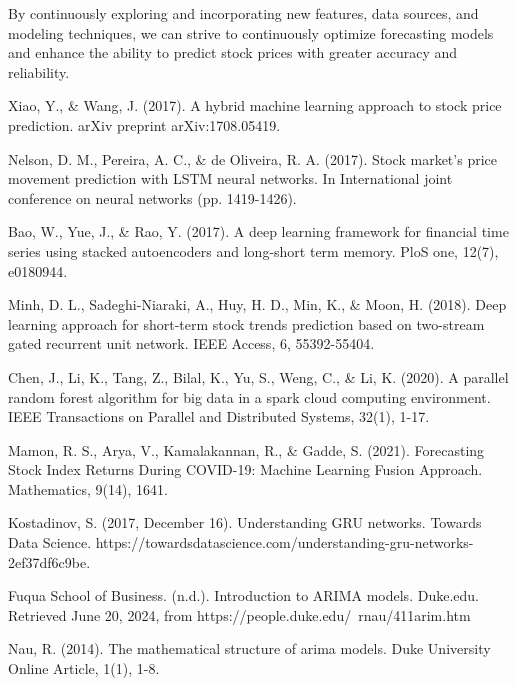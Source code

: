 \documentclass{ieeeojies}
\begin{document}
By continuously exploring and incorporating new features, data sources, and modeling techniques, we can strive to continuously optimize forecasting models and enhance the ability to predict stock prices with greater accuracy and reliability.
\begin{thebibliography}{00}
 Xiao, Y., \& Wang, J. (2017). A hybrid machine learning approach to stock price prediction. arXiv preprint arXiv:1708.05419.

 Nelson, D. M., Pereira, A. C., \& de Oliveira, R. A. (2017). Stock market's price movement prediction with LSTM neural networks. In International joint conference on neural networks (pp. 1419-1426).

 Bao, W., Yue, J., \& Rao, Y. (2017). A deep learning framework for financial time series using stacked autoencoders and long-short term memory. PloS one, 12(7), e0180944.

 Minh, D. L., Sadeghi-Niaraki, A., Huy, H. D., Min, K., \& Moon, H. (2018). Deep learning approach for short-term stock trends prediction based on two-stream gated recurrent unit network. IEEE Access, 6, 55392-55404.

 Chen, J., Li, K., Tang, Z., Bilal, K., Yu, S., Weng, C., \& Li, K. (2020). A parallel random forest algorithm for big data in a spark cloud computing environment. IEEE Transactions on Parallel and Distributed Systems, 32(1), 1-17.

 Mamon, R. S., Arya, V., Kamalakannan, R., \& Gadde, S. (2021). Forecasting Stock Index Returns During COVID-19: Machine Learning Fusion Approach. Mathematics, 9(14), 1641.

 Kostadinov, S. (2017, December 16). Understanding GRU networks. Towards Data Science. https://towardsdatascience.com/understanding-gru-networks-2ef37df6c9be.

 Fuqua School of Business. (n.d.). Introduction to ARIMA models. Duke.edu. Retrieved June 20, 2024, from https://people.duke.edu/~rnau/411arim.htm

 Nau, R. (2014). The mathematical structure of arima models. Duke University Online Article, 1(1), 1-8.



\end{thebibliography}


\EOD
\end{document}
